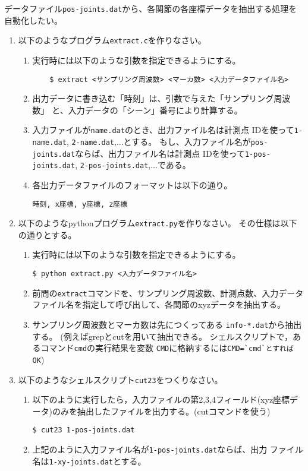 \documentclass{jsarticle}
\begin{document}
データファイル\verb|pos-joints.dat|から、各関節の各座標データを抽出する処理を自動化したい。
\begin{enumerate}
\item 以下のようなプログラム\verb|extract.c|を作りなさい。
  \begin{enumerate}
  \item 実行時には以下のような引数を指定できるようにする。
\begin{verbatim}
    $ extract <サンプリング周波数> <マーカ数> <入力データファイル名>
\end{verbatim}
  \item 出力データに書き込む「時刻」は、引数で与えた「サンプリング周波数」
    と、入力データの「シーン」番号により計算する。
  \item 入力ファイルが\verb|name.dat|のとき、出力ファイル名は計測点
    IDを使って\verb|1-name.dat|, \verb|2-name.dat|,...とする。
    もし、入力ファイル名が\verb|pos-joints.dat|ならば、出力ファイル名は計測点
    IDを使って\verb|1-pos-joints.dat|,
    \verb|2-pos-joints.dat|,...である。
  \item 各出力データファイルのフォーマットは以下の通り。
\begin{verbatim}
時刻, x座標, y座標, z座標
\end{verbatim}
  \end{enumerate}
\item  以下のようなpythonプログラム\verb|extract.py|を作りなさい。
  その仕様は以下の通りとする。
  \begin{enumerate}
  \item 実行時には以下のような引数を指定できるようにする。
\begin{verbatim}
$ python extract.py <入力データファイル名>
\end{verbatim}
  \item 前問の\verb|extract|コマンドを、サンプリング周波数、計測点数、入力データファイル名を指定して呼び出して、各関節のxyzデータを抽出する。
  \item サンプリング周波数とマーカ数は先につくってある
    \verb|info-*.dat|から抽出する。
    (例えばgrepとcutを用いて抽出できる。
    シェルスクリプトで，あるコマンド\verb|cmd|の実行結果を変数
    \verb|CMD|に格納するには\verb|CMD=`cmd`とすればOK|)
  \end{enumerate}
\item 以下のようなシェルスクリプト\verb|cut23|をつくりなさい。
\begin{enumerate}
\item 以下のように実行したら，入力ファイルの第2,3,4フィールド(xyz座標データ)のみを抽出したファイルを出力する。(cutコマンドを使う)
\begin{verbatim}
$ cut23 1-pos-joints.dat
\end{verbatim}
\item 上記のように入力ファイル名が\verb|1-pos-joints.dat|ならば、出力
  ファイル名は\verb|1-xy-joints.dat|とする。
\end{enumerate}
\end{enumerate}
\end{document}

